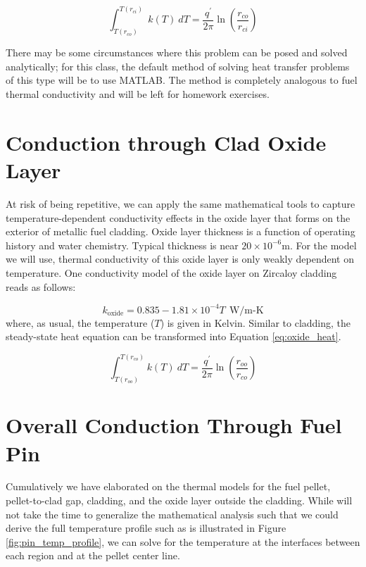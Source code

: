 \begin{equation}
\int_{T(r_{co})}^{T(r_{ci})} \ k(T) \ dT = \frac{q^{\prime}}{2 \pi} \ln{\left(\frac{r_{co}}{r_{ci}} \right)}
\label{eq:clad_heat}
\end{equation}

There may be some circumstances where this problem can be posed and solved analytically; for this class, the default method of solving heat transfer problems of this type will be to use MATLAB.  The method is completely analogous to fuel thermal conductivity and will be left for homework exercises.

\section{Conduction through Clad Oxide Layer}
At risk of being repetitive, we can apply the same mathematical tools to capture temperature-dependent conductivity effects in the oxide layer that forms on the exterior of metallic fuel cladding.  
Oxide layer thickness is a function of operating history and water chemistry.  Typical thickness is near $20\times 10^{-6}$m.  For the model we will use, thermal conductivity of this oxide layer is only weakly dependent on temperature.  One conductivity model of the oxide layer on Zircaloy cladding reads as follows:

\begin{equation}
k_{\text{oxide}}=0.835 - 1.81 \times 10^{-4}T \ \  \text{W/m-K}
\label{eq:cond_oxide}
\end{equation}
where, as usual, the temperature ($T$) is given in Kelvin. Similar to cladding, the steady-state heat equation can be transformed into Equation \ref{eq:oxide_heat}.

\begin{equation}
\int_{T(r_{oo})}^{T(r_{co})} k(T) \ dT = \frac{q^{\prime}}{2 \pi}\ln{\left(\frac{r_{oo}}{r_{co}} \right)}
\label{eq:oxide_heat}
\end{equation}

\section{Overall Conduction Through Fuel Pin}

Cumulatively we have elaborated on the thermal models for the fuel pellet, pellet-to-clad gap, cladding, and the oxide layer outside the cladding.  While will not take the time to generalize the mathematical analysis such that we could derive the full temperature profile such as is illustrated in Figure \ref{fig:pin_temp_profile}, we can solve for the temperature at the interfaces between each region and at the pellet center line.

